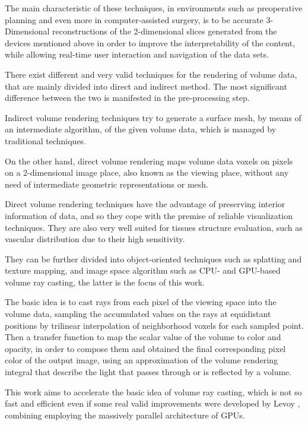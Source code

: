\documentclass[12pt,a4paper]{extarticle}
\newcommand{\linespace}{\vspace{0pt}}
\begin{document}
The main characteristic of these techniques, in environments such as preoperative planning and even more in computer-assisted surgery, is to be accurate 3-Dimensional reconstructions of the 2-dimensional slices generated from the devices mentioned above in order to improve the interpretability of the content, while allowing real-time user interaction and navigation of the data sets.
\linespace

There exist different and very valid techniques for the rendering of volume data, that are mainly divided into direct and indirect method. The most significant difference between the two is manifested in the pre-processing step.

Indirect volume rendering techniques try to generate a surface mesh, by means of an intermediate algorithm, of the given volume data, which is managed by traditional techniques.

On the other hand, direct volume rendering maps volume data voxels on pixels on a 2-dimensional image place, also known as the viewing place, without any need of intermediate geometric representations or mesh.

Direct volume rendering techniques have the advantage of preserving interior information of data, and so they cope with the premise of reliable visualization techniques. They are also very well suited for tissues structure evaluation, such as vascular distribution due to their high sensitivity.

They can be further divided into object-oriented techniques such as splatting and texture mapping, and image space algorithm such as CPU- and GPU-based volume ray casting, the latter is the focus of this work.

The basic idea is to cast rays from each pixel of the
viewing space into the volume data, sampling the accumulated values on the rays at equidistant positions by trilinear interpolation of neighborhood voxels for each sampled point. Then a transfer function to map the scalar value of
the volume to color and opacity, in order to compose them and obtained the final corresponding pixel color of the output image, using an approximation of the volume rendering integral that describe the light that passes through or is reflected by a volume.
\linespace

This work aims to accelerate the basic idea of volume ray casting, which is not so fast and efficient even if some real valid improvements were developed by Levoy \cite{levoy_1990:5}, combining employing the massively parallel architecture of GPUs.
\end{document}
